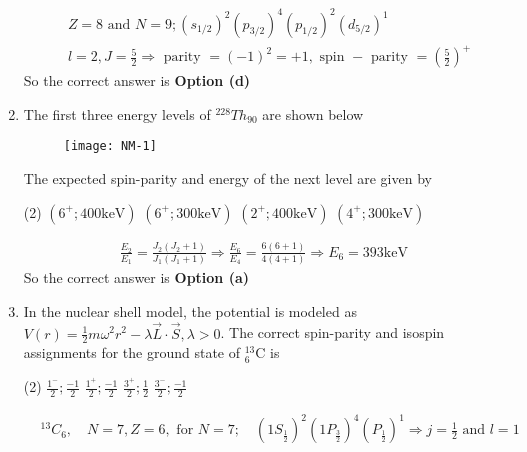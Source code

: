 \begin{enumerate}
	\begin{answer}
		\begin{align*}
		&Z=8 \text { and } N=9 ;\left(s_{1 / 2}\right)^2\left(p_{3 / 2}\right)^4\left(p_{1 / 2}\right)^2\left(d_{5 / 2}\right)^1\\
		&l=2, J=\frac{5}{2} \Rightarrow \text { parity }=(-1)^2=+1, \text { spin }-\text { parity }=\left(\frac{5}{2}\right)^{+}
		\end{align*}
		So the correct answer is \textbf{Option (d)}
	\end{answer}
	\item The first three energy levels of ${ }^{228} T h_{90}$ are shown below
	\begin{figure}[H]
		\centering
		\texttt{[image: NM-1]}
	\end{figure}
	The expected spin-parity and energy of the next level are given by
	{}
	\begin{tasks}(2)
		\task[\textbf{a.}]$\left(6^{+} ; 400 \mathrm{keV}\right)$
		\task[\textbf{b.}]$\left(6^{+} ; 300 \mathrm{keV}\right)$
		\task[\textbf{c.}]$\left(2^{+} ; 400 \mathrm{keV}\right)$
		\task[\textbf{d.}] $\left(4^{+} ; 300 \mathrm{keV}\right)$
	\end{tasks}
	\begin{answer}
		\begin{align*}
		\frac{E_2}{E_1}=\frac{J_2\left(J_2+1\right)}{J_1\left(J_1+1\right)} \Rightarrow \frac{E_6}{E_4}=\frac{6(6+1)}{4(4+1)} \Rightarrow E_6=393 \mathrm{keV}
		\end{align*}
		So the correct answer is \textbf{Option (a)}
	\end{answer}
	\item  In the nuclear shell model, the potential is modeled as $V(r)=\frac{1}{2} m \omega^2 r^2-\lambda \vec{L} \cdot \vec{S}, \lambda>0$. The correct spin-parity and isospin assignments for the ground state of ${ }_6^{13} \mathrm{C}$ is
	{}
	\begin{tasks}(2)
		\task[\textbf{a.}]$\frac{1^{-}}{2} ; \frac{-1}{2}$
		\task[\textbf{b.}]$\frac{1^{+}}{2} ; \frac{-1}{2}$
		\task[\textbf{c.}]$\frac{3^{+}}{2} ; \frac{1}{2}$
		\task[\textbf{d.}] $\frac{3^{-}}{2} ; \frac{-1}{2}$
	\end{tasks}
	\begin{answer}
		\begin{align*}
		&{ }^{13} C_6, \quad N=7, Z=6, \text { for } N=7 ; \quad\left(1 S_{\frac{1}{2}}\right)^2\left(1 P_{\frac{3}{2}}\right)^4\left(P_{\frac{1}{2}}\right)^1 \Rightarrow j=\frac{1}{2} \text { and } l=1\\

\end{align*}
\end{answer}
\end{enumerate}
